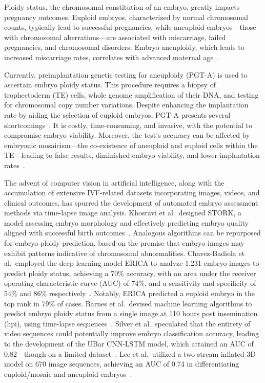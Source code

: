 \documentclass[12pt]{article}
\begin{document}
Ploidy status, the chromosomal constitution of an embryo, greatly impacts pregnancy outcomes. Euploid embryos, characterized by normal chromosomal counts, typically lead to successful pregnancies, while aneuploid embryos---those with chromosomal aberrations---are associated with miscarriage, failed pregnancies, and chromosomal disorders. Embryo aneuploidy, which leads to increased miscarriage rates, correlates with advanced maternal age~\citep{maxwell2016variability}.

Currently, preimplantation genetic testing for aneuploidy (PGT-A) is used to ascertain embryo ploidy status. This procedure requires a biopsy of trophectoderm (TE) cells, whole genome amplification of their DNA, and testing for chromosomal copy number variations. Despite enhancing the implantation rate by aiding the selection of euploid embryos, PGT-A presents several shortcomings~\citep{munne2019examining}. It is costly, time-consuming, and invasive, with the potential to compromise embryo viability. Moreover, the test's accuracy can be affected by embryonic mosaicism---the co-existence of aneuploid and euploid cells within the TE---leading to false results, diminished embryo viability, and lower implantation rates~\citep{viotti2021pgt, capalbo2021preimplantation}.

The advent of computer vision in artificial intelligence, along with the accumulation of extensive IVF-related datasets incorporating images, videos, and clinical outcomes, has spurred the development of automated embryo assessment methods via time-lapse image analysis. Khosravi et al.\ designed STORK, a model assessing embryo morphology and effectively predicting embryo quality aligned with successful birth outcomes~\citep{khosravi2019deep}. Analogous algorithms can be repurposed for embryo ploidy prediction, based on the premise that embryo images may exhibit patterns indicative of chromosomal abnormalities. Chavez-Badiola et al.\ employed the deep learning model ERICA to analyze 1,231 embryo images to predict ploidy status, achieving a 70\% accuracy, with an area under the receiver operating characteristic curve (AUC) of 74\%, and a sensitivity and specificity of 54\% and 86\% respectively~\citep{chavezbadiola2020erica}. Notably, ERICA predicted a euploid embryo in the top rank in 79\% of cases. Barnes et al.\ devised machine learning algorithms to predict embryo ploidy status from a single image at 110 hours post insemination (hpi), using time-lapse sequences~\citep{barnes2023noninvasive}. Silver et al.\ speculated that the entirety of video sequences could potentially improve embryo classification accuracy, leading to the development of the UBar CNN-LSTM model, which attained an AUC of 0.82---though on a limited dataset~\citep{silver2020end}. Lee et al.\ utilized a two-stream inflated 3D model on 670 image sequences, achieving an AUC of 0.74 in differentiating euploid/mosaic and aneuploid embryos~\citep{lee2021deep}.
\end{document}
